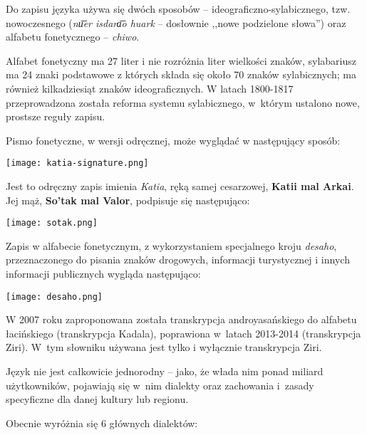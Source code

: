 \begin{spacing}{1.1}
Do zapisu języka używa się dwóch sposobów --  ideograficzno-sylabicznego,
tzw. nowoczesnego (\emph{nu͞er isdara͞o huark} -- dosłownie
,,nowe podzielone słowa'') oraz alfabetu fonetycznego -- \emph{chiwo}.

Alfabet fonetyczny ma 27 liter i nie rozróżnia liter wielkości znaków, sylabariusz 
ma 24 znaki podstawowe z których składa się około 70 znaków sylabicznych; 
ma również kilkadziesiąt znaków ideograficznych. W latach 1800-1817 przeprowadzona
została reforma systemu sylabicznego, w~którym ustalono nowe, prostsze reguły zapisu.

Pismo fonetyczne, w wersji odręcznej, może wyglądać w następujący sposób:

\begin{center}
    \texttt{[image: katia-signature.png]}    
\end{center}

Jest to odręczny zapis imienia \emph{Katia}, ręką samej cesarzowej, \textbf{Katii mal Arkai}.
Jej mąż, \textbf{So'tak mal Valor}, podpisuje się następująco:

\begin{center}
    \texttt{[image: sotak.png]}
\end{center}

Zapis w alfabecie fonetycznym, z wykorzystaniem specjalnego kroju \emph{desaho},
przeznaczonego do pisania znaków drogowych, informacji turystycznej i innych
informacji publicznych wygląda następująco:

\begin{center}
    \texttt{[image: desaho.png]}
\end{center}

\skipline

W 2007 roku zaproponowana została transkrypcja androyasańskiego do alfabetu 
łacińskiego (transkrypcja Kadala), poprawiona w~latach 2013-2014 (transkrypcja 
Ziri). W~tym słowniku używana jest tylko i wyłącznie transkrypcja Ziri.

Język nie jest całkowicie jednorodny -- jako, że włada nim ponad miliard 
użytkowników, pojawiają się w~nim dialekty oraz zachowania i~zasady specyficzne 
dla danej kultury lub regionu. 

Obecnie wyróżnia się 6 głównych dialektów: 


\end{spacing}
